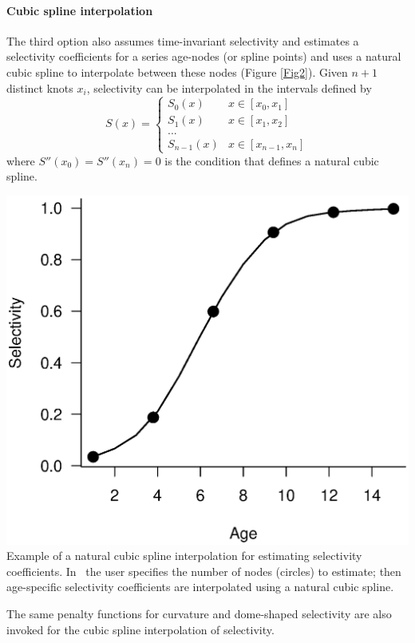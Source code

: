 \begin{multicols}{2}
\paragraph{Cubic spline interpolation}
The third option also assumes time-invariant selectivity and estimates a selectivity coefficients for a series age-nodes (or spline points) and uses a natural cubic spline to interpolate between these nodes (Figure \ref{Fig2}). Given $n+1$ distinct knots $x_i$, selectivity can be interpolated in the intervals defined by
\[
S(x) = \begin{cases}
	S_0(x) & x \in [x_0,x_1]\\
	S_1(x) & x \in [x_1,x_2]\\
	...\\
	S_{n-1}(x) & x \in [x_{n-1},x_n]
\end{cases}
\]
where  $S''(x_0) = S''(x_n)=0$  is the condition that defines a natural cubic spline.
\begin{figurehere}
	\centering
	\includegraphics[width=\columnwidth]{iscamFigs/SplineEg.eps}\\
	\caption{Example of a natural cubic spline interpolation for estimating selectivity coefficients.  In \iscam\ the user specifies the number of nodes (circles) to estimate; then age-specific selectivity coefficients are interpolated using a natural cubic spline.}\label{Fig2}
\end{figurehere}

The same penalty functions for curvature and dome-shaped selectivity are also invoked for the cubic spline interpolation of selectivity.


\end{multicols}
